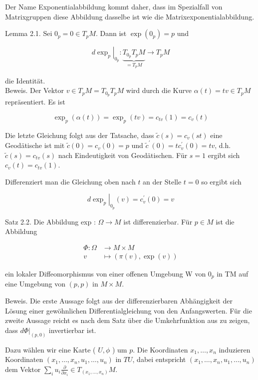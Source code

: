 \documentclass[10pt, letterpaper]{article}
\begin{document}
Der Name Exponentialabbildung kommt daher, dass im Spezialfall von Matrixgruppen diese Abbildung dasselbe ist wie die Matrixexponentialabbildung.

Lemma 2.1. Sei $0_{p}=0 \in T_{p} M$. Dann ist $\exp \left(0_{p}\right)=p$ und

$$
\left.d \exp _{p}\right|_{0_{p}}: \underbrace{T_{0_{p}} T_{p} M}_{=T_{p} M} \rightarrow T_{p} M
$$

die Identität.\\
Beweis. Der Vektor $v \in T_{p} M=T_{0_{p}} T_{p} M$ wird durch die Kurve $\alpha(t)=t v \in T_{p} M$ repräsentiert. Es ist

$$
\exp _{p}(\alpha(t))=\exp _{p}(t v)=c_{t v}(1)=c_{v}(t)
$$

Die letzte Gleichung folgt aus der Tatsache, dass $\tilde{c}(s)=c_{v}(s t)$ eine Geodätische ist mit $\tilde{c}(0)=c_{v}(0)=p$ und $\tilde{c}^{\prime}(0)=t c_{v}^{\prime}(0)=t v$, d.h. $\tilde{c}(s)=c_{t v}(s)$ nach Eindeutigkeit von Geodätischen. Für $s=1$ ergibt sich $c_{v}(t)=c_{t v}(1)$.

Differenziert man die Gleichung oben nach $t$ an der Stelle $t=0$ so ergibt sich

$$
\left.d \exp _{p}\right|_{0_{p}}(v)=c_{v}^{\prime}(0)=v
$$

Satz 2.2. Die Abbildung exp : $\Omega \rightarrow M$ ist differenzierbar. Für $p \in M$ ist die Abbildung

$$
\begin{aligned}
\Phi: \Omega & \rightarrow M \times M \\
v & \mapsto(\pi(v), \exp (v))
\end{aligned}
$$

ein lokaler Diffeomorphismus von einer offenen Umgebung W von $0_{p}$ in TM auf eine Umgebung von $(p, p)$ in $M \times M$.

Beweis. Die erste Aussage folgt aus der differenzierbaren Abhängigkeit der Lösung einer gewöhnlichen Differentialgleichung von den Anfangswerten. Für die zweite Aussage reicht es nach dem Satz über die Umkehrfunktion aus zu zeigen, dass $\left.d \Phi\right|_{(p, 0)}$ invertierbar ist.

Dazu wählen wir eine Karte ( $U, \phi$ ) um $p$. Die Koordinaten $x_{1}, \ldots, x_{n}$ induzieren Koordinaten $\left(x_{1}, \ldots, x_{n}, u_{1}, \ldots, u_{n}\right)$ in $T U$, dabei entspricht $\left(x_{1}, \ldots, x_{n}, u_{1}, \ldots, u_{n}\right)$ dem Vektor $\sum_{i} u_{i} \frac{\partial}{\partial x_{i}} \in T_{\left(x_{1}, \ldots, x_{n}\right)} M$.
\end{document}

